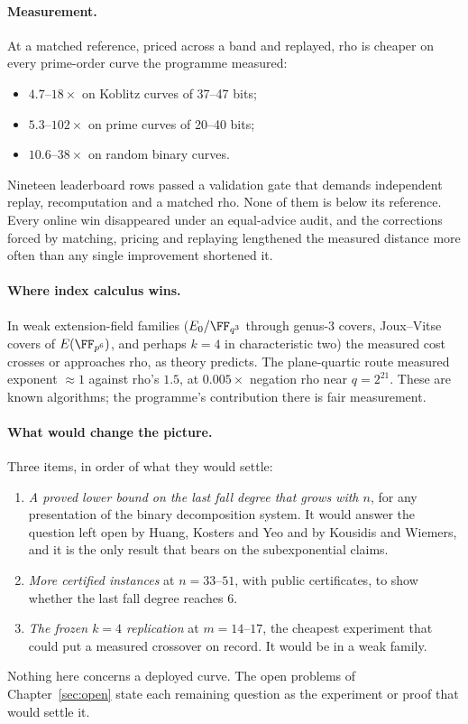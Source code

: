 \paragraph{Measurement.} At a matched reference, priced across a band and
replayed, rho is cheaper on every prime-order curve the programme measured:
\begin{itemize}
\item $4.7$--$18\times$ on Koblitz curves of 37--47 bits;
\item $5.3$--$102\times$ on prime curves of 20--40 bits;
\item $10.6$--$38\times$ on random binary curves.
\end{itemize}
Nineteen leaderboard rows passed a validation gate that demands independent
replay, recomputation and a matched rho. None of them is below its
reference. Every online win disappeared under an equal-advice audit, and
the corrections forced by matching, pricing and replaying lengthened the
measured distance more often than any single improvement shortened it.

\paragraph{Where index calculus wins.} In weak extension-field families
($E_0/\FF_{q^3}$ through genus-3 covers, Joux--Vitse covers of
$E(\FF_{p^6})$, and perhaps $k=4$ in characteristic two) the measured cost
crosses or approaches rho, as theory predicts. The plane-quartic route
measured exponent $\approx1$ against rho's $1.5$, at $0.005\times$ negation
rho near $q=2^{21}$. These are known algorithms; the programme's
contribution there is fair measurement.

\paragraph{What would change the picture.} Three items, in order of what
they would settle:
\begin{enumerate}
\item \emph{A proved lower bound on the last fall degree that grows with
  $n$}, for any presentation of the binary decomposition system. It would
  answer the question left open by Huang, Kosters and Yeo and by
  Kousidis and Wiemers, and it is the only result that bears on the
  subexponential claims.
\item \emph{More certified instances} at $n=33$--$51$, with public
  certificates, to show whether the last fall degree reaches 6.
\item \emph{The frozen $k=4$ replication} at $m=14$--$17$, the cheapest
  experiment that could put a measured crossover on record. It would be
  in a weak family.
\end{enumerate}
Nothing here concerns a deployed curve. The open problems of
Chapter~\ref{sec:open} state each remaining question as the experiment or
proof that would settle it.
